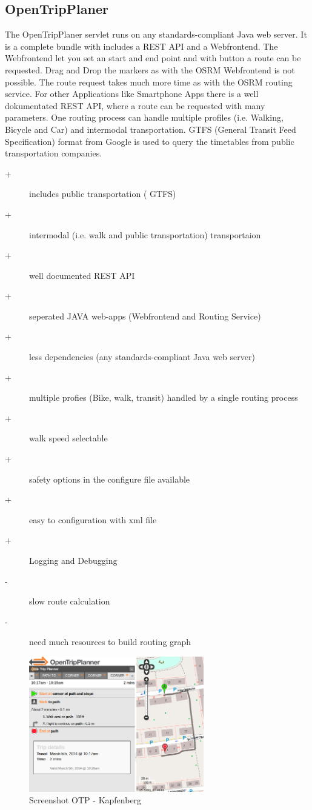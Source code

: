 \documentclass{sig-alternate}
\begin{document}


\subsection{OpenTripPlaner}
\label{subsec:otp}
 
The OpenTripPlaner servlet runs on any standards-compliant Java web server. It is a complete bundle with includes a REST API and a Webfrontend. The Webfrontend let you set an start and end point and with button a route can be requested. Drag and Drop the markers as with the OSRM Webfrontend is not possible. The route request takes much more time as with the OSRM routing service. For other Applications like Smartphone Apps there is a well dokumentated REST API, where a route can be requested with many parameters. One routing process can handle multiple profiles (i.e. Walking, Bicycle and Car) and intermodal transportation. GTFS (General Transit Feed Specification) format from Google is used to query the timetables from public transportation companies. 

\begin{description}
  \item[+] includes public transportation ( GTFS)
  \item[+] intermodal (i.e. walk and public transportation) transportaion
  \item[+] well documented REST API
  \item[+] seperated JAVA web-apps (Webfrontend and Routing Service)
  \item[+] less dependencies (any standards-compliant Java web server)
  \item[+] multiple profies (Bike, walk, transit) handled by a single routing process
  \item[+] walk speed selectable
  \item[+] safety options in the configure file available
  \item[+] easy to configuration with xml file
  \item[+] Logging and Debugging 
  \item[-] slow route calculation
  \item[-] need much resources to build routing graph   
\end{description} 
 
\begin{figure}
\centering
\includegraphics[width=3in]{otp-ss.png}
\caption{Screenshot OTP - Kapfenberg}
\end{figure}
 
\end{document}
